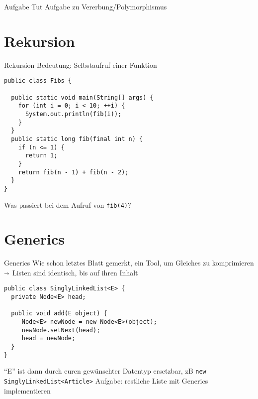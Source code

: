 \documentclass[18pt]{beamer}
\begin{document}
\begin{frame}[fragile]{Aufgabe}
Tut Aufgabe zu Vererbung/Polymorphismus
\end{frame}


\section{Rekursion}
\begin{frame}[fragile]{Rekursion}
Bedeutung: Selbstaufruf einer Funktion \pause
\begin{lstlisting}
public class Fibs {

  public static void main(String[] args) {
    for (int i = 0; i < 10; ++i) {
      System.out.println(fib(i));
    }
  }
  public static long fib(final int n) {
    if (n <= 1) {
      return 1;
    }
    return fib(n - 1) + fib(n - 2);
  }
}
\end{lstlisting} \pause
Was passiert bei dem Aufruf von \lstinline{fib(4)}?
\end{frame}

\section{Generics}
\begin{frame}[fragile]{Generics}
Wie schon letztes Blatt gemerkt, ein Tool, um Gleiches zu komprimieren
$\shortrightarrow$ Listen sind identisch, bis auf ihren Inhalt \pause
\begin{lstlisting}
public class SinglyLinkedList<E> {
  private Node<E> head;

  public void add(E object) {
     Node<E> newNode = new Node<E>(object);
     newNode.setNext(head);
     head = newNode;
  }
}
\end{lstlisting} \pause
"`E"' ist dann durch euren gewünschter Datentyp ersetzbar, zB \lstinline{new SinglyLinkedList<Article>} \newline \pause
Aufgabe: restliche Liste mit Generics implementieren
\end{frame}


\appendix
\beginbackup


\backupend
\end{document}
